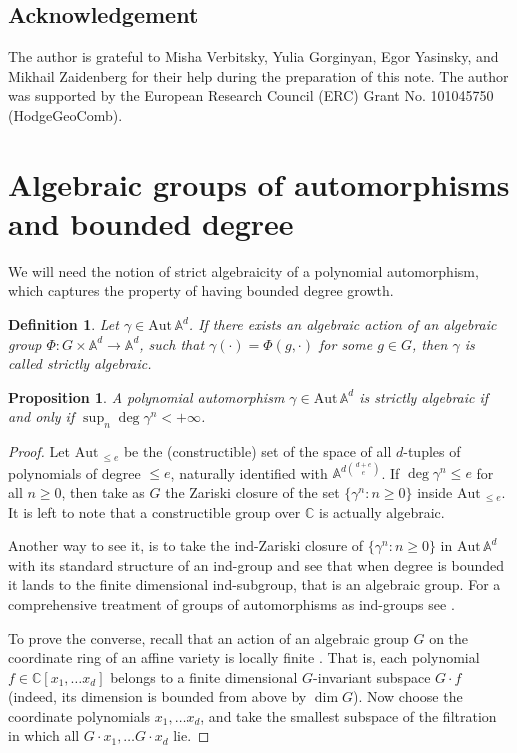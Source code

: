 \documentclass[12pt]{article}
\newtheorem{proposition}{Proposition}
\newtheorem{definition}{Definition}
\newcommand{\aut}{\mathrm{Aut\,}}
\begin{document}
\subsection*{Acknowledgement}

The author is grateful to Misha Verbitsky, Yulia Gorginyan, Egor Yasinsky, and Mikhail Zaidenberg for their help during the preparation of this note. The author was supported by the European Research Council (ERC) Grant No. 101045750 (HodgeGeoComb).
\section{Algebraic groups of automorphisms and bounded degree}

We will need the notion of strict algebraicity of a polynomial automorphism, which captures the property of having bounded degree growth.

\begin{definition}
Let $\gamma\in \aut \mathbb A^d$. If there exists an algebraic action of an algebraic group $\Phi: G\times\mathbb A^d\to\mathbb A^d$, such that $\gamma(\cdot)=\Phi(g,\cdot)$ for some $g\in G$, then $\gamma$ is called strictly algebraic.
\end{definition}

\begin{proposition}
A polynomial automorphism $\gamma\in \aut \mathbb A^d$ is strictly algebraic if and only if $ \sup_n \deg \gamma^n <+\infty $. 
\end{proposition}
\begin{proof}
Let $\aut_{\le e} $ be the (constructible) set of the space of all $d$-tuples of polynomials of degree $ \le e$, naturally identified with $ \mathbb A^{d\binom{d+e}{e}}$. If $\deg \gamma^n\le e$ for all $n\ge 0$, then take as $G$ the Zariski closure of the set $\{\gamma^n: n\ge 0\} $ inside $\aut_{\le e} $. It is left to note that a constructible group over $ \mathbb C $ is actually algebraic.

Another way to see it, is to take the ind-Zariski closure of $\{\gamma^n: n\ge 0\} $ in $\aut \mathbb A^d $ with its standard structure of an ind-group and see that when degree is bounded it lands to the finite dimensional ind-subgroup, that is an algebraic group. For a comprehensive treatment of groups of automorphisms as ind-groups see \cite{FK}.

To prove the converse, recall that an action of an algebraic group $G$ on the coordinate ring of an affine variety is locally finite \cite[Proposition 1.9]{borel}. That is, each polynomial $f \in \mathbb{C}[x_1,\dots x_d]$ belongs to a finite dimensional $G$-invariant subspace $ G\cdot f $ (indeed, its dimension is bounded from above by $\dim G$). Now choose the coordinate polynomials $x_1,\dots x_d$, and take the smallest subspace of the filtration in which all $G\cdot x_1,\dots G\cdot x_d$ lie.

\end{proof}
\end{document}
